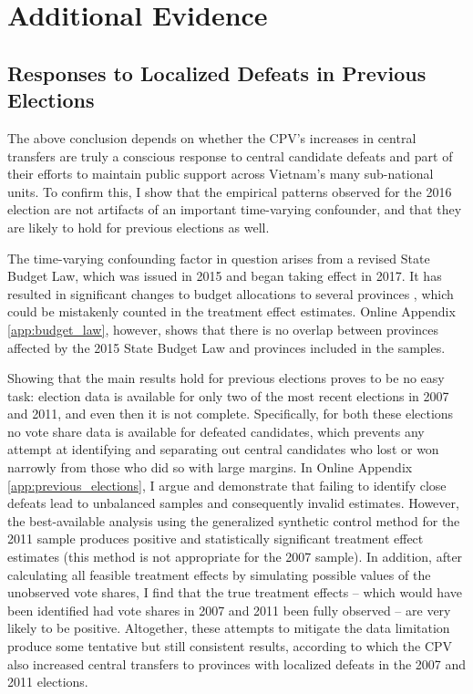 \documentclass[12pt]{article}
\newcommand{\1}{\mathbbm{1}}
\begin{document}
\section*{Additional Evidence}
\label{sec:additional}

\subsection*{Responses to Localized Defeats in Previous Elections}

The above conclusion depends on whether the CPV's increases in central transfers are truly a conscious response to central candidate defeats and part of their efforts to maintain public support across Vietnam's many sub-national units. To confirm this, I show that the empirical patterns observed for the 2016 election are not artifacts of an important time-varying confounder, and that they are likely to hold for previous elections as well.

The time-varying confounding factor in question arises from a revised State Budget Law, which was issued in 2015 and began taking effect in 2017. It has resulted in significant changes to budget allocations to several provinces \citep{BaoViet2016}, which could be mistakenly counted in the treatment effect estimates. Online Appendix \ref{app:budget_law}, however, shows that there is no overlap between provinces affected by the 2015 State Budget Law and provinces included in the samples.

Showing that the main results hold for previous elections proves to be no easy task: election data is available for only two of the most recent elections in 2007 and 2011, and even then it is not complete. Specifically, for both these elections no vote share data is available for defeated candidates, which prevents any attempt at identifying and separating out central candidates who lost or won narrowly from those who did so with large margins. In Online Appendix \ref{app:previous_elections}, I argue and demonstrate that failing to identify close defeats lead to unbalanced samples and consequently invalid estimates. However, the best-available analysis using the generalized synthetic control method for the 2011 sample produces positive and statistically significant treatment effect estimates (this method is not appropriate for the 2007 sample). In addition, after calculating all feasible treatment effects by simulating possible values of the unobserved vote shares, I find that the true treatment effects -- which would have been identified had vote shares in 2007 and 2011 been fully observed -- are very likely to be positive. Altogether, these attempts to mitigate the data limitation produce some tentative but still consistent results, according to which the CPV also increased central transfers to provinces with localized defeats in the 2007 and 2011 elections.
\end{document}
